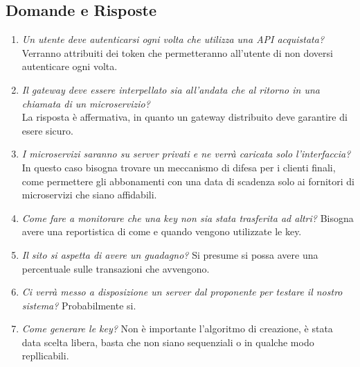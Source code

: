 \documentclass[12pt,a4paper,titlepage]{article}
\begin{document}
\subsection{Domande e Risposte}
\begin{enumerate}
	\item \textit{Un utente deve autenticarsi ogni volta che utilizza una API acquistata?}\\
	\hspace{35pt}Verranno attribuiti dei token che permetteranno all'utente di non doversi autenticare ogni volta.
	\item \textit{Il gateway deve essere interpellato sia all'andata che al ritorno in una chiamata di un microservizio?}\\
	\hspace{35pt}La risposta è affermativa, in quanto un gateway distribuito deve garantire di esere sicuro.
	\item \textit{I microservizi saranno su server privati e ne verrà caricata solo l'interfaccia?}
	\hspace{35pt}In questo caso bisogna trovare un meccanismo di difesa per i clienti finali, come permettere gli abbonamenti con una data di scadenza solo ai fornitori di microservizi che siano affidabili.
	\item \textit{Come fare a monitorare che una key non sia stata trasferita ad altri?}
	\hspace{35pt}Bisogna avere una reportistica di come e quando vengono utilizzate le key.
	\item \textit{Il sito si aspetta di avere un guadagno?}
	\hspace{35pt}Si presume si possa avere una percentuale sulle transazioni che avvengono.
	\item \textit{Ci verrà messo a disposizione un server dal proponente per testare il nostro sistema?}
	\hspace{35pt}Probabilmente si.
	\item \textit{Come generare le key?}
	\hspace{35pt} Non è importante l'algoritmo di creazione, è stata data scelta libera, basta che non siano sequenziali o in qualche modo repllicabili.
\end{enumerate}
\end{document}

